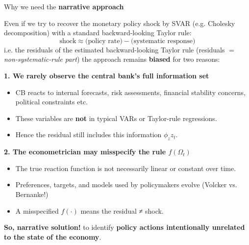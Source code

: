 \documentclass{beamer}
\begin{document}
\begin{frame}{Why we need the \textbf{narrative approach}}
\footnotesize

Even if we try to recover the monetary policy shock by SVAR (e.g. Cholesky decomposition) with a standard backward-looking Taylor rule:
\[
\text{shock} \approx \text{(policy rate)} - \text{(systematic response)}
\]
i.e. the residuals of the estimated backward-looking Taylor rule (residuals $=$ \textit{non-systematic-rule part}) the approach remains \textbf{biased} for two reasons:

\medskip
\textbf{1. We rarely observe the central bank’s full information set}
\begin{itemize}
  \item CB reacts to internal forecasts, risk assessments,
        financial stability concerns, political constraints etc.
  \item These variables are \textbf{not} in typical VARs or Taylor-rule regressions.
  \item Hence the residual still includes this information $\phi_z z_t$.
\end{itemize}

\medskip
\textbf{2. The econometrician may misspecify the rule $f(\Omega_t)$}
\begin{itemize}
  \item The true reaction function is not necessarily linear or constant over time.
  \item Preferences, targets, and models used by policymakers evolve (Volcker vs. Bernanke!)
  \item A misspecified $f(\cdot)$ means the residual ≠ shock.
\end{itemize}

\bigskip

\textbf{So, narrative solution!} to identify \textbf{policy actions intentionally unrelated to the state of the economy}.

\end{frame}
\end{document}
